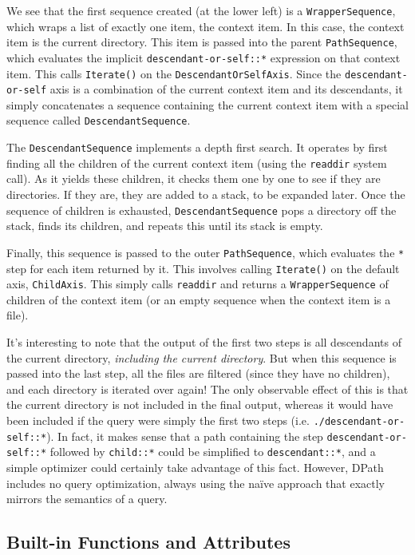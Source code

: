 \documentclass{scrartcl}
\begin{document}
We see that the first sequence created (at the lower left) is a
\texttt{WrapperSequence}, which wraps a list of exactly one item, the context
item. In this case, the context item is the current directory. This item is
passed into the parent \texttt{PathSequence}, which evaluates the implicit
\texttt{descendant-or-self::*} expression on that context item. This calls
\texttt{Iterate()} on the \texttt{DescendantOrSelfAxis}. Since the
\texttt{descendant-or-self} axis is a combination of the current context item
and its descendants, it simply concatenates a sequence containing the current
context item with a special sequence called \texttt{DescendantSequence}.

The \texttt{DescendantSequence} implements a depth first search. It operates by
first finding all the children of the current context item (using the
\texttt{readdir} system call). As it yields these children, it checks them one
by one to see if they are directories. If they are, they are added to a stack,
to be expanded later. Once the sequence of children is exhausted,
\texttt{DescendantSequence} pops a directory off the stack, finds its children,
and repeats this until its stack is empty.

Finally, this sequence is passed to the outer \texttt{PathSequence}, which
evaluates the \texttt{*} step for each item returned by it. This involves
calling \texttt{Iterate()} on the default axis, \texttt{ChildAxis}. This simply
calls \texttt{readdir} and returns a \texttt{WrapperSequence} of children of the
context item (or an empty sequence when the context item is a file).

It's interesting to note that the output of the first two steps is all
descendants of the current directory, \emph{including the current directory}.
But when this sequence is passed into the last step, all the files are filtered
(since they have no children), and each directory is iterated over again! The
only observable effect of this is that the current directory is not included in
the final output, whereas it would have been included if the query were simply
the first two steps (i.e. \texttt{./descendant-or-self::*}). In fact, it makes
sense that a path containing the step \texttt{descendant-or-self::*} followed by
\texttt{child::*} could be simplified to \texttt{descendant::*}, and a simple
optimizer could certainly take advantage of this fact. However, DPath includes
no query optimization, always using the na\"ive approach that exactly mirrors
the semantics of a query.

\subsection{Built-in Functions and Attributes}
\end{document}
